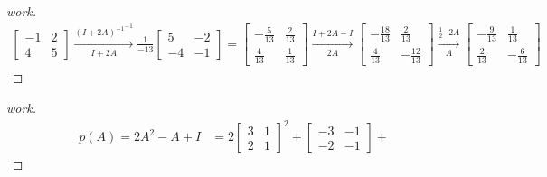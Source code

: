 \documentclass{article}
\begin{document}
\begin{enumerate}
  \begin{proof}[work]
    \begin{align*}
      \begin{bmatrix}
        -1 & 2 \\
        4  & 5
      \end{bmatrix} \xrightarrow[I + 2A]{{(I + 2A)^{-1}}^{-1}}
      \frac{1}{-13}
      \begin{bmatrix}
        5  & -2 \\
        -4 & -1
      \end{bmatrix} =
      \begin{bmatrix}
        -\frac{5}{13} & \frac{2}{13} \\
        \frac{4}{13}  & \frac{1}{13}
      \end{bmatrix} \xrightarrow[2A]{I + 2A - I}
      \begin{bmatrix}
        -\frac{18}{13} & \frac{2}{13}   \\
        \frac{4}{13}   & -\frac{12}{13}
      \end{bmatrix} \xrightarrow[A]{\frac{1}{2} \cdot 2A}
      \begin{bmatrix}
        -\frac{9}{13} & \frac{1}{13}  \\
        \frac{2}{13}  & -\frac{6}{13}
      \end{bmatrix}
    \end{align*}
  \end{proof}
  \begin{proof}[work]
    \begin{align*}
      p(A) = 2A^2 - A + I & = 2\begin{bmatrix}
                                 3 & 1 \\
                                 2 & 1
                               \end{bmatrix}^2 +
      \begin{bmatrix}
        -3 & -1 \\
        -2 & -1
      \end{bmatrix} +

\end{align*}
\end{proof}
\end{enumerate}
\end{document}
